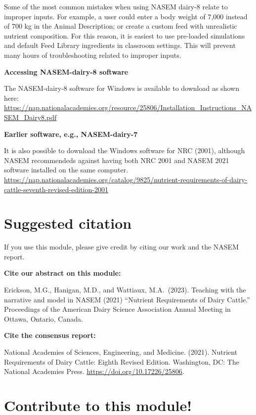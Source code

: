 \documentclass[
]{book}
\begin{document}
Some of the most common mistakes when using NASEM dairy-8 relate to improper inputs. For example, a user could enter a body weight of 7,000 instead of 700 kg in the Animal Description; or create a custom feed with unrealistic nutrient composition. For this reason, it is easiest to use pre-loaded simulations and default Feed Library ingredients in classroom settings. This will prevent many hours of troubleshooting related to improper inputs.

\textbf{Accessing NASEM-dairy-8 software}

The NASEM-dairy-8 software for Windows is available to download as shown here:
\url{https://nap.nationalacademies.org/resource/25806/Installation_Instructions_NASEM_Dairy8.pdf}

\textbf{Earlier software, e.g., NASEM-dairy-7 }

It is also possible to download the Windows software for NRC (2001), although NASEM recommendeds against having both NRC 2001 and NASEM 2021 software installed on the same computer. \url{https://nap.nationalacademies.org/catalog/9825/nutrient-requirements-of-dairy-cattle-seventh-revised-edition-2001}

\hypertarget{suggested-citation}{%
\section{Suggested citation}\label{suggested-citation}}

If you use this module, please give credit by citing our work and the NASEM report.

\textbf{Cite our abstract on this module:}

Erickson, M.G., Hanigan, M.D., and Wattiaux, M.A.~(2023). Teaching with the narrative and model in NASEM (2021) ``Nutrient Requirements of Dairy Cattle.'' Proceedings of the American Dairy Science Association Annual Meeting in Ottawa, Ontario, Canada.

\textbf{Cite the consensus report:}

National Academies of Sciences, Engineering, and Medicine. (2021). Nutrient Requirements of Dairy Cattle: Eighth Revised Edition. Washington, DC: The National Academies Press. \url{https://doi.org/10.17226/25806}.

\hypertarget{contribute-to-this-module}{%
\section{Contribute to this module!}\label{contribute-to-this-module}}
\end{document}
